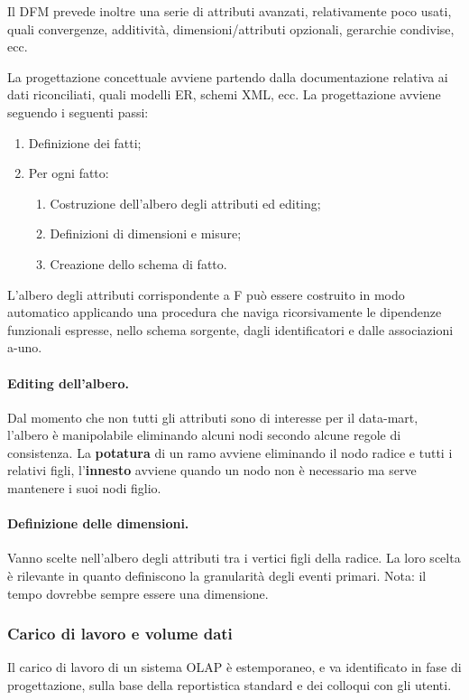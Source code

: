 \documentclass[a4paper, 10pt]{article}
\begin{document}
	Il DFM prevede inoltre una serie di attributi avanzati, relativamente poco usati, quali convergenze, additività, dimensioni/attributi opzionali, gerarchie condivise, ecc.
	
	La progettazione concettuale avviene partendo dalla documentazione relativa ai dati riconciliati, quali modelli ER, schemi XML, ecc. La progettazione avviene seguendo i seguenti passi: \begin{enumerate}
		\item Definizione dei fatti;
		\item Per ogni fatto: \begin{enumerate}
			\item Costruzione dell'albero degli attributi ed editing;
			\item Definizioni di dimensioni e misure;
			\item Creazione dello schema di fatto.
		\end{enumerate}
	\end{enumerate}
	
	L’albero degli attributi corrispondente a F può essere costruito in modo automatico applicando una procedura che naviga ricorsivamente le dipendenze funzionali espresse, nello schema sorgente, dagli identificatori e dalle associazioni a-uno.
	
	\paragraph{Editing dell'albero.} Dal momento che non tutti gli attributi sono di interesse per il data-mart, l'albero è manipolabile eliminando alcuni nodi secondo alcune regole di consistenza. La \textbf{potatura} di un ramo avviene eliminando il nodo radice e tutti i relativi figli, l'\textbf{innesto} avviene quando un nodo non è necessario ma serve mantenere i suoi nodi figlio.
	
	\paragraph{Definizione delle dimensioni.} Vanno scelte nell'albero degli attributi tra i vertici figli della radice. La loro scelta è rilevante in quanto definiscono la granularità degli eventi primari. Nota: il tempo dovrebbe sempre essere una dimensione.
	
	\subsubsection{Carico di lavoro e volume dati}
	Il carico di lavoro di un sistema OLAP è estemporaneo, e va identificato in fase di progettazione, sulla base della reportistica standard e dei colloqui con gli utenti.
	
\end{document}

